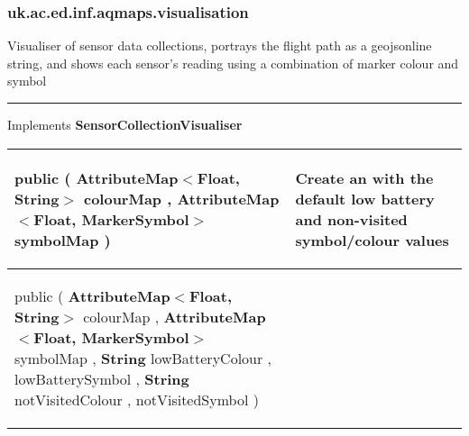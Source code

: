\subsubsection*{ uk.ac.ed.inf.aqmaps.visualisation }
 {\scriptsize Visualiser of sensor data collections, portrays the flight path as a geojsonline string, and shows each sensor's reading using a combination of marker colour and symbol
 
\vspace*{4pt} \hrule \vspace*{3pt}
Implements \textbf{ SensorCollectionVisualiser }
\vspace*{-5pt} 
\begin{tabularx}{\linewidth}{X|m{}}
\label{tab:AQMapGenerator}
\begin{raggedleft}public  \textbf{\hyperref[tab:AQMapGenerator]{\color{blue}{AQMapGenerator}} }(\newline \hfill 
\hspace*{ 5pt} \textbf{AttributeMap$<$Float, String$>$} colourMap , \newline
 \hspace*{ 5pt} \textbf{AttributeMap$<$Float, MarkerSymbol$>$} symbolMap  )
\end{raggedleft} &
 Create an \hyperref[tab:AQMapGenerator]{\color{blue}{AQMapGenerator}} with the default low battery and non{-}visited symbol/colour values\\ \hline 
\begin{raggedleft}public  \textbf{\hyperref[tab:AQMapGenerator]{\color{blue}{AQMapGenerator}} }(\newline \hfill 
\hspace*{ 5pt} \textbf{AttributeMap$<$Float, String$>$} colourMap , \newline
 \hspace*{ 5pt} \textbf{AttributeMap$<$Float, MarkerSymbol$>$} symbolMap , \newline
 \hspace*{ 5pt} \textbf{String} lowBatteryColour , \newline
 \hspace*{ 5pt} \textbf{\hyperref[tab:MarkerSymbol]{\color{blue}{MarkerSymbol}}} lowBatterySymbol , \newline
 \hspace*{ 5pt} \textbf{String} notVisitedColour , \newline
 \hspace*{ 5pt} \textbf{\hyperref[tab:MarkerSymbol]{\color{blue}{MarkerSymbol}}} notVisitedSymbol  )

\end{raggedleft}
\end{tabularx}}
